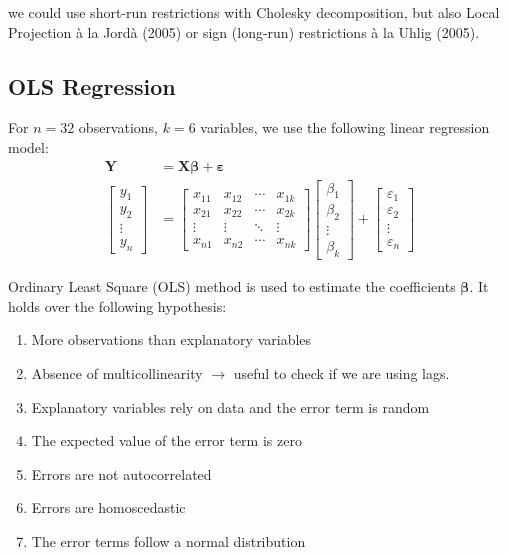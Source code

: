 we could use short-run restrictions with Cholesky decomposition, but also Local Projection à la Jordà (2005) or sign (long-run) restrictions à la Uhlig (2005).

\subsection{OLS Regression}
For $n = 32$ observations, $k = 6$ variables, we use the following linear regression model:
\begin{align*}
    \boldsymbol{Y} & = \boldsymbol{X} \boldsymbol{\beta} + \boldsymbol{\varepsilon} \\
    \begin{bmatrix} 
        y_1 \\ y_2 \\ \vdots \\ y_n 
        \end{bmatrix} & = \begin{bmatrix}
        x_{11} & x_{12} & \cdots & x_{1k} \\ 
        x_{21} & x_{22} & \cdots & x_{2k} \\ 
        \vdots & \vdots & \ddots & \vdots \\ 
        x_{n1} & x_{n2} & \cdots & x_{nk} 
        \end{bmatrix} \begin{bmatrix}
        \beta_1 \\ \beta_2 \\ \vdots \\ \beta_k 
        \end{bmatrix} + \begin{bmatrix} 
        \varepsilon_1 \\ \varepsilon_2 \\ \vdots \\ \varepsilon_n \end{bmatrix}
\end{align*}

Ordinary Least Square (OLS) method is used to estimate the coefficients $\boldsymbol{\beta}$. It holds over the following hypothesis:
\begin{enumerate}
    \item More observations than explanatory variables
    \item Absence of multicollinearity $\to$ useful to check if we are using lags.
    \item Explanatory variables rely on data and the error term is random
    \item The expected value of the error term is zero
    \item Errors are not autocorrelated
    \item Errors are homoscedastic
    \item The error terms follow a normal distribution
\end{enumerate}

